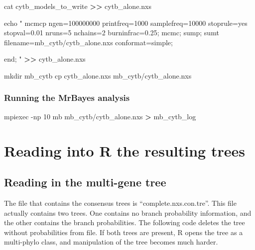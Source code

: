 \documentclass[
]{article}
\newenvironment{Shaded}{\begin{snugshade}}{\end{snugshade}}
\newcommand{\AttributeTok}[1]{\textcolor[rgb]{0.77,0.63,0.00}{#1}}
\newcommand{\BuiltInTok}[1]{#1}
\newcommand{\ExtensionTok}[1]{#1}
\newcommand{\FunctionTok}[1]{\textcolor[rgb]{0.00,0.00,0.00}{#1}}
\newcommand{\NormalTok}[1]{#1}
\newcommand{\OperatorTok}[1]{\textcolor[rgb]{0.81,0.36,0.00}{\textbf{#1}}}
\newcommand{\StringTok}[1]{\textcolor[rgb]{0.31,0.60,0.02}{#1}}
\begin{document}
\begin{Shaded}
\begin{Highlighting}[]
\FunctionTok{cat}\NormalTok{ cytb\_models\_to\_write }\OperatorTok{\textgreater{}\textgreater{}}\NormalTok{ cytb\_alone.nxs}

\BuiltInTok{echo} \StringTok{"}
\StringTok{      mcmcp ngen=100000000 printfreq=1000 samplefreq=10000 stoprule=yes stopval=0.01 nruns=5 nchains=2 burninfrac=0.25;}
\StringTok{      mcmc;}
\StringTok{      sump;}
\StringTok{      sumt filename=mb\_cytb/cytb\_alone.nxs conformat=simple;}

\StringTok{end;}
\StringTok{"} \OperatorTok{\textgreater{}\textgreater{}}\NormalTok{ cytb\_alone.nxs}

\FunctionTok{mkdir}\NormalTok{ mb\_cytb}
\FunctionTok{cp}\NormalTok{ cytb\_alone.nxs mb\_cytb/cytb\_alone.nxs}
\end{Highlighting}
\end{Shaded}

\hypertarget{running-the-mrbayes-analysis-2}{%
\subsubsection{Running the MrBayes
analysis}\label{running-the-mrbayes-analysis-2}}

\begin{Shaded}
\begin{Highlighting}[]
\ExtensionTok{mpiexec} \AttributeTok{{-}np}\NormalTok{ 10 mb mb\_cytb/cytb\_alone.nxs }\OperatorTok{\textgreater{}}\NormalTok{ mb\_cytb\_log}
\end{Highlighting}
\end{Shaded}

\hypertarget{reading-into-r-the-resulting-trees}{%
\section{Reading into R the resulting
trees}\label{reading-into-r-the-resulting-trees}}

\hypertarget{reading-in-the-multi-gene-tree}{%
\subsection{Reading in the multi-gene
tree}\label{reading-in-the-multi-gene-tree}}

The file that contains the consensus trees is ``complete.nxs.con.tre''.
This file actually contains two trees. One contains no branch
probability information, and the other contains the branch
probabilities. The following code deletes the tree without probabilities
from file. If both trees are present, R opens the tree as a multi-phylo
class, and manipulation of the tree becomes much harder.
\end{document}

